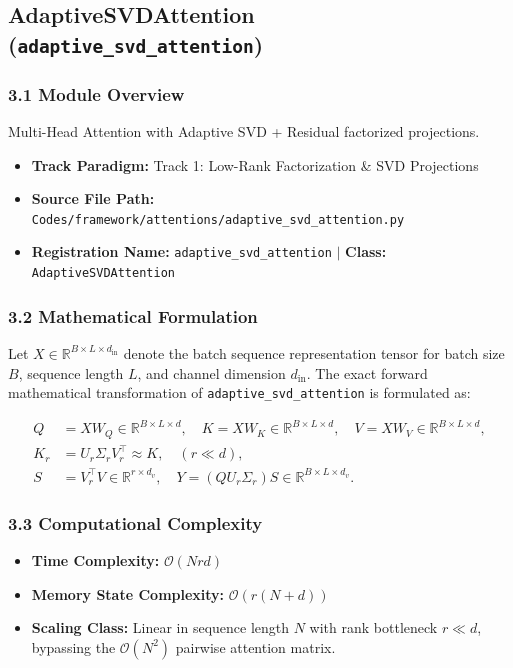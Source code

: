\subsection{AdaptiveSVDAttention (\texttt{adaptive\_svd\_attention})}
\label{sec:app_module_adaptive\_svd\_attention}

\subsubsection*{3.1 Module Overview}
Multi-Head Attention with Adaptive SVD + Residual factorized projections.
\begin{itemize}
    \item \textbf{Track Paradigm:} Track 1: Low-Rank Factorization & SVD Projections
    \item \textbf{Source File Path:} \texttt{Codes/framework/attentions/adaptive\_svd\_attention.py}
    \item \textbf{Registration Name:} \texttt{adaptive\_svd\_attention} $\mid$ \textbf{Class:} \texttt{AdaptiveSVDAttention}
\end{itemize}

\subsubsection*{3.2 Mathematical Formulation}
Let $X \in \mathbb{R}^{B \times L \times d_{\text{in}}}$ denote the batch sequence representation tensor for batch size $B$, sequence length $L$, and channel dimension $d_{\text{in}}$. The exact forward mathematical transformation of \texttt{adaptive\_svd\_attention} is formulated as:

\begin{align}
Q &= X W_Q \in \mathbb{R}^{B \times L \times d}, \quad K = X W_K \in \mathbb{R}^{B \times L \times d}, \quad V = X W_V \in \mathbb{R}^{B \times L \times d}, \\
K_r &= U_r \Sigma_r V_r^\top \approx K, \quad (r \ll d), \\
S &= V_r^\top V \in \mathbb{R}^{r \times d_v}, \quad Y = (Q U_r \Sigma_r) S \in \mathbb{R}^{B \times L \times d_v}.
\end{align}


\subsubsection*{3.3 Computational Complexity}
\begin{itemize}
    \item \textbf{Time Complexity:} $\mathcal{O}(N r d)$
    \item \textbf{Memory State Complexity:} $\mathcal{O}(r(N + d))$
    \item \textbf{Scaling Class:} Linear in sequence length $N$ with rank bottleneck $r \ll d$, bypassing the $\mathcal{O}(N^2)$ pairwise attention matrix.
\end{itemize}

